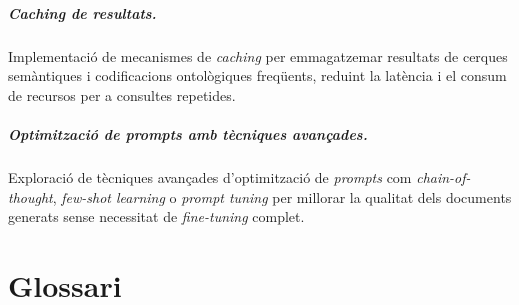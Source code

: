 \documentclass[CAT]{TFUOC}%
\begin{document}
\paragraph{\textit{Caching} de resultats.}
Implementació de mecanismes de \textit{caching} per emmagatzemar resultats de cerques semàntiques i codificacions ontològiques freqüents, reduint la latència i el consum de recursos per a consultes repetides.

\paragraph{Optimització de \textit{prompts} amb tècniques avançades.}
Exploració de tècniques avançades d'optimització de \textit{prompts} com \textit{chain-of-thought}, \textit{few-shot learning} o \textit{prompt tuning} per millorar la qualitat dels documents generats sense necessitat de \textit{fine-tuning} complet.

\chapter{Glossari}
\end{document}
